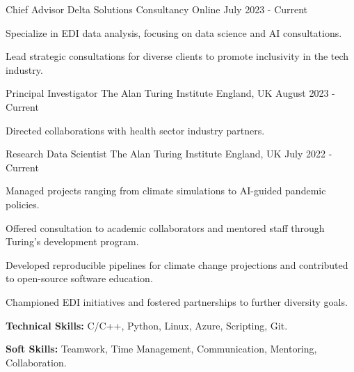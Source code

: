 
\begin{cventries}

  \cventry
    {Chief Advisor} %
    {Delta Solutions Consultancy} %
    {Online} %
    {July 2023 - Current} %
    {
      \begin{cvitems}
        \item {Specialize in EDI data analysis, focusing on data science and AI consultations.}
        \item {Lead strategic consultations for diverse clients to promote inclusivity in the tech industry.}
      \end{cvitems}
    }

  \cventry
    {Principal Investigator} %
    {The Alan Turing Institute} %
    {England, UK} %
    {August 2023 - Current} %
    {
      \begin{cvitems}
        \item {Directed collaborations with health sector industry partners.}
      \end{cvitems}
    }

  \cventry
    {Research Data Scientist} %
    {The Alan Turing Institute} %
    {England, UK} %
    {July 2022 - Current} %
    {
      \begin{cvitems}
        \item {Managed projects ranging from climate simulations to AI-guided pandemic policies.}
        \item {Offered consultation to academic collaborators and mentored staff through Turing's development program.}
        \item {Developed reproducible pipelines for climate change projections and contributed to open-source software education.}
        \item {Championed EDI initiatives and fostered partnerships to further diversity goals.}
        \item {\textbf{Technical Skills:} C/C++, Python, Linux, Azure, Scripting, Git.}
        \item {\textbf{Soft Skills:} Teamwork, Time Management, Communication, Mentoring, Collaboration.}
      \end{cvitems}
    }


\end{cventries}
